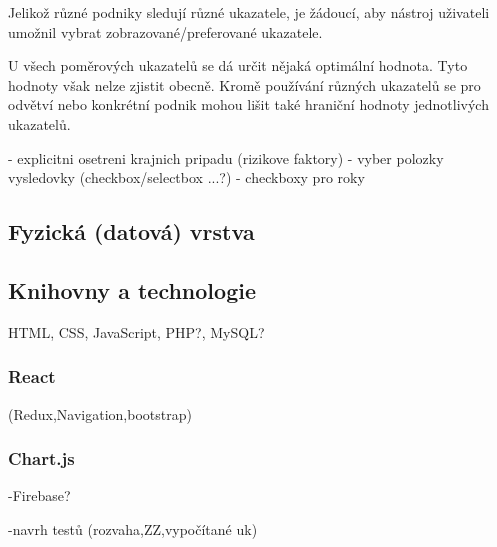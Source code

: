 Jelikož různé podniky sledují různé ukazatele, je žádoucí, aby nástroj uživateli umožnil vybrat zobrazované/preferované ukazatele. 

U všech poměrových ukazatelů se dá určit nějaká optimální hodnota. Tyto hodnoty však nelze zjistit obecně. Kromě používání různých ukazatelů se pro odvětví nebo konkrétní podnik mohou lišit také hraniční hodnoty jednotlivých ukazatelů.


- explicitni osetreni krajnich pripadu (rizikove faktory)
- vyber polozky vysledovky (checkbox/selectbox ...?)
- checkboxy pro roky

\subsection{Fyzická (datová) vrstva}

\subsection{Knihovny a technologie}
HTML, CSS, JavaScript, PHP?, MySQL?

\subsubsection{React}

(Redux,Navigation,bootstrap)

\subsubsection{Chart.js}



-Firebase?

-navrh testů (rozvaha,ZZ,vypočítané uk)